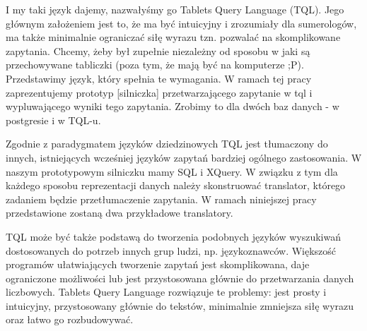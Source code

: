 I my taki język dajemy, nazwałyśmy go Tablets Query Language (TQL). Jego głównym założeniem jest to, że ma być intuicyjny i zrozumiały dla sumerologów, ma także minimalnie ograniczać siłę wyrazu tzn. pozwalać na skomplikowane zapytania. Chcemy, żeby był zupełnie niezależny od sposobu w jaki są przechowywane tabliczki (poza tym, że mają być na komputerze ;P). Przedstawimy język, który spełnia te wymagania. 
W ramach tej pracy zaprezentujemy prototyp [silniczka] przetwarzającego zapytanie w tql i wypluwającego wyniki tego zapytania. Zrobimy to dla dwóch baz danych - w postgresie i w TQL-u.


Zgodnie z paradygmatem języków dziedzinowych TQL jest tłumaczony do innych, istniejących wcześniej języków zapytań bardziej ogólnego zastosowania. W naszym prototypowym silniczku mamy SQL i XQuery.
W związku z tym dla każdego sposobu reprezentacji danych należy skonstruować translator, 
którego zadaniem będzie przetłumaczenie zapytania. 
W ramach niniejszej pracy przedstawione zostaną dwa przykładowe translatory.



TQL może być także podstawą do tworzenia podobnych języków wyszukiwań dostosowanych do potrzeb innych grup ludzi, np. językoznawców.
Większość programów ułatwiających tworzenie zapytań jest skomplikowana, daje ograniczone możliwości lub jest przystosowana głównie do przetwarzania danych liczbowych. Tablets Query Language rozwiązuje te problemy: jest prosty i intuicyjny, przystosowany głównie do tekstów, minimalnie zmniejsza siłę wyrazu oraz łatwo go rozbudowywać. 



